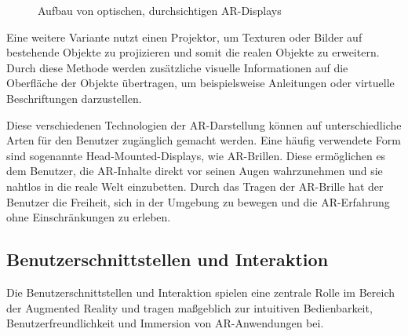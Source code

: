 \begin{figure}[h]
      \centering
      
      \caption[width=0.7\columnwidth]{Aufbau von optischen, durchsichtigen AR-Displays \cite{billinghurst2015survey}}
      \label{fig:OSTAR}
\end{figure}

Eine weitere Variante nutzt einen Projektor, um Texturen oder Bilder auf
bestehende Objekte zu projizieren und somit die realen Objekte zu erweitern.
Durch diese Methode werden zusätzliche visuelle Informationen auf die
Oberfläche der Objekte übertragen, um beispielsweise Anleitungen oder virtuelle
Beschriftungen darzustellen.

Diese verschiedenen Technologien der AR-Darstellung können auf unterschiedliche
Arten für den Benutzer zugänglich gemacht werden. Eine häufig verwendete Form
sind sogenannte Head-Mounted-Displays, wie AR-Brillen. Diese ermöglichen es dem
Benutzer, die AR-Inhalte direkt vor seinen Augen wahrzunehmen und sie nahtlos
in die reale Welt einzubetten. Durch das Tragen der AR-Brille hat der Benutzer
die Freiheit, sich in der Umgebung zu bewegen und die AR-Erfahrung ohne
Einschränkungen zu erleben. \cite{billinghurst2015survey}

\subsection{Benutzerschnittstellen und Interaktion}
Die Benutzerschnittstellen und Interaktion spielen eine zentrale Rolle im
Bereich der Augmented Reality und tragen maßgeblich zur intuitiven
Bedienbarkeit, Benutzerfreundlichkeit und Immersion von AR-Anwendungen bei.

